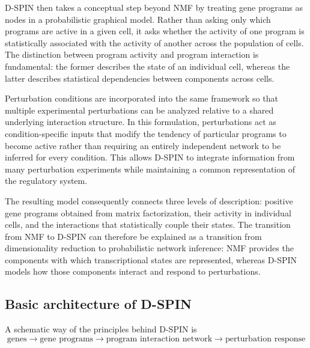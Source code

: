 \documentclass[11pt,a4paper]{article}
\begin{document}

D-SPIN then takes a conceptual step beyond NMF by treating gene programs as nodes in a probabilistic graphical model. Rather than asking only which programs are active in a given cell, it asks whether the activity of one program is statistically associated with the activity of another across the population of cells. 
The distinction between program activity and program interaction is fundamental: the former describes the state of an individual cell, whereas the latter describes statistical dependencies between components across cells. 

Perturbation conditions are incorporated into the same framework so that multiple experimental perturbations can be analyzed relative to a shared underlying interaction structure. In this formulation, perturbations act as condition-specific inputs that modify the tendency of particular programs to become active rather than requiring an entirely independent network to be inferred for every condition. This allows D-SPIN to integrate information from many perturbation experiments while maintaining a common representation of the regulatory system. 

The resulting model consequently connects three levels of description: positive gene programs obtained from matrix factorization, their activity in individual cells, and the interactions that statistically couple their states. The transition from NMF to D-SPIN can therefore be explained as a transition from dimensionality reduction to probabilistic network inference: NMF provides the components with which transcriptional states are represented, whereas D-SPIN models how those components interact and respond to perturbations. 

\subsection{Basic architecture of D-SPIN}

\noindent A schematic way of the principles behind D-SPIN is
\[
\boxed{
	\text{genes}
	\longrightarrow
	\text{gene programs}
	\longrightarrow
	\text{program interaction network}
	\longrightarrow
	\text{perturbation response}
}
\]
\end{document}
